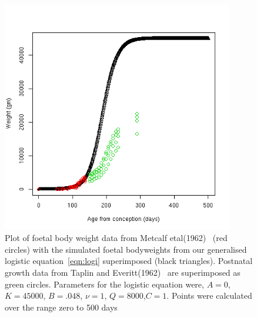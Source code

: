 %

\begin{figure}[!h]
  \centering
   \includegraphics[width=0.9\textwidth]{lwagefit2.png}
  \caption{Plot of foetal body weight data from Metcalf etal(1962)~\cite{metc:62} (red circles) with the simulated foetal bodyweights from our generalised logistic equation~\ref{eqn:logi} superimposed (black triangles). Postnatal growth data from Taplin and Everitt(1962)~\cite{tapl:62} are superimposed as green circles.  Parameters for the logistic equation were, $A=0$, $K=45000$, $B=.048$, $\nu=1$, $Q=8000$,$C=1$. Points were calculated over the range zero to 500 days}
  \label{fig:mlbwagefit}
\end{figure}

%

